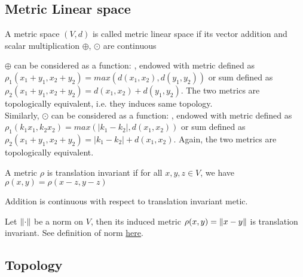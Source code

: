 \documentclass{article}
\begin{document}
\subsection{Metric Linear space}\label{Metric linear space}
\begin{definition}\rm\nextline
	A metric space $(V,d)$ is called metric linear space if its vector addition and scalar multiplication $\oplus$, $\odot$ are continuous
\end{definition}


\begin{remark}\rm\nextline
	$\oplus$ can be considered as a function: , endowed with metric  defined as $\rho_1(x_1+y_1,x_2+y_2)=max(d(x_1,x_2),d(y_1,y_2))$
	or sum  defined as $\rho_2(x_1+y_1,x_2+y_2)=d(x_1,x_2)+d(y_1,y_2)$. The two metrics are topologically equivalent, i.e. they induces same topology.\\
	Similarly, $\odot$ can be considered as a function: , endowed with metric  defined as $\rho_1(k_1x_1,k_2x_2)=max(|k_1-k_2|,d(x_1,x_2))$
	or sum  defined as $\rho_2(x_1+y_1,x_2+y_2)=|k_1-k_2|+d(x_1,x_2)$. Again, the two metrics are topologically equivalent.
\end{remark}

\begin{definition}\rm\nextline
	A metric $\rho$ is translation invariant if for all $x,y,z\in V$, we have  $\rho(x,y)=\rho(x-z,y-z)$
\end{definition}

\begin{proposition}\rm\nextline
	Addition is continuous with respect to translation invariant metic.
\end{proposition}

\begin{proposition}\rm\nextline
	Let $\left\|{\cdot}\right\|$ be a norm on $V$, then its induced metric $\rho(x,y)=\left\|{x-y}\right\|$ is translation invariant. See definition of norm {\color{red} \hyperref[definition of norm]{here}}.
\end{proposition}

\subsection{Topology}\label{topology}
\end{document}
